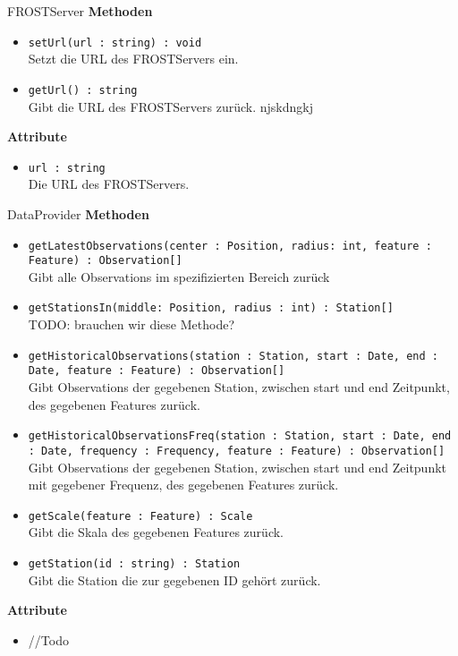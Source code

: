 \begin{Class}{FROSTServer}
    \textbf{Methoden}
    \begin{itemize}
        \item \texttt{setUrl(url : string) : void}
        \\Setzt die URL des FROSTServers ein.
        \item \texttt{getUrl() : string}
        \\Gibt die URL des FROSTServers zurück. njskdngkj
    \end{itemize}
    
    \textbf{Attribute}
    \begin{itemize}
        \item \texttt{url : string}
        \\Die URL des FROSTServers.
    \end{itemize}
\end{Class}

\begin{Class}{DataProvider}
    \textbf{Methoden}
    \begin{itemize}
        \item \texttt{getLatestObservations(center : Position, radius: int, feature : Feature) : Observation[]}
        \\Gibt alle Observations im spezifizierten Bereich zurück
        \item \texttt{getStationsIn(middle: Position, radius : int) : Station[]}
        \\TODO: brauchen wir diese Methode?
        \item \texttt{getHistoricalObservations(station : Station, start : Date, end : Date, feature : Feature) : Observation[]}
        \\Gibt Observations der gegebenen Station, zwischen start und end Zeitpunkt, des gegebenen Features zurück.
        \item \texttt{getHistoricalObservationsFreq(station : Station, start : Date, end : Date, frequency : Frequency, feature : Feature) : Observation[]}
        \\Gibt Observations der gegebenen Station, zwischen start und end Zeitpunkt mit gegebener Frequenz, des gegebenen Features zurück.
        \item \texttt{getScale(feature : Feature) : Scale}
        \\Gibt die Skala des gegebenen Features zurück.
        \item \texttt{getStation(id : string) : Station}
        \\Gibt die Station die zur gegebenen ID gehört zurück.
    \end{itemize}
    
    \textbf{Attribute}
    \begin{itemize}
        \item //Todo
    \end{itemize}
\end{Class}
